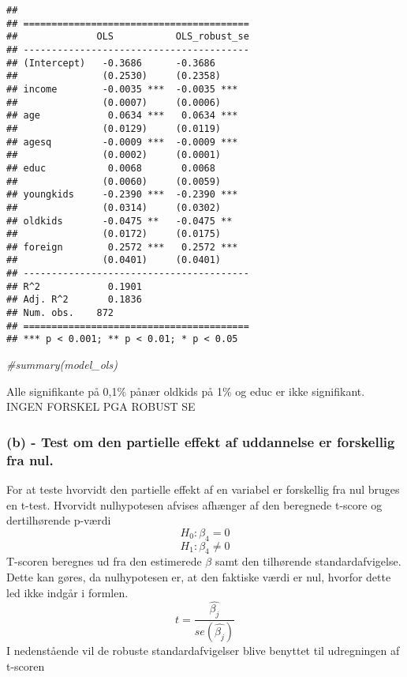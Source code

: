 \documentclass[
]{article}
\newenvironment{Shaded}{\begin{snugshade}}{\end{snugshade}}
\newcommand{\CommentTok}[1]{\textcolor[rgb]{0.56,0.35,0.01}{\textit{#1}}}
\begin{document}
\begin{verbatim}
## 
## ========================================
##              OLS           OLS_robust_se
## ----------------------------------------
## (Intercept)   -0.3686      -0.3686      
##               (0.2530)     (0.2358)     
## income        -0.0035 ***  -0.0035 ***  
##               (0.0007)     (0.0006)     
## age            0.0634 ***   0.0634 ***  
##               (0.0129)     (0.0119)     
## agesq         -0.0009 ***  -0.0009 ***  
##               (0.0002)     (0.0001)     
## educ           0.0068       0.0068      
##               (0.0060)     (0.0059)     
## youngkids     -0.2390 ***  -0.2390 ***  
##               (0.0314)     (0.0302)     
## oldkids       -0.0475 **   -0.0475 **   
##               (0.0172)     (0.0175)     
## foreign        0.2572 ***   0.2572 ***  
##               (0.0401)     (0.0401)     
## ----------------------------------------
## R^2            0.1901                   
## Adj. R^2       0.1836                   
## Num. obs.    872                        
## ========================================
## *** p < 0.001; ** p < 0.01; * p < 0.05
\end{verbatim}

\begin{Shaded}
\begin{Highlighting}[]
\CommentTok{\#summary(model\_ols)}
\end{Highlighting}
\end{Shaded}

Alle signifikante på 0,1\% pånær oldkids på 1\% og educ er ikke
signifikant. INGEN FORSKEL PGA ROBUST SE

\hypertarget{b---test-om-den-partielle-effekt-af-uddannelse-er-forskellig-fra-nul.}{%
\subsubsection{(b) - Test om den partielle effekt af uddannelse er
forskellig fra
nul.}\label{b---test-om-den-partielle-effekt-af-uddannelse-er-forskellig-fra-nul.}}

For at teste hvorvidt den partielle effekt af en variabel er forskellig
fra nul bruges en t-test. Hvorvidt nulhypotesen afvises afhænger af den
beregnede t-score og dertilhørende p-værdi \[H_0: \beta_4 = 0\]
\[H_1: \beta_4 \neq 0\] T-scoren beregnes ud fra den estimerede
\(\beta\) samt den tilhørende standardafvigelse. Dette kan gøres, da
nulhypotesen er, at den faktiske værdi er nul, hvorfor dette led ikke
indgår i formlen. \[t = \frac{\hat{\beta_j}}{se(\hat{\beta_j})}\] I
nedenstående vil de robuste standardafvigelser blive benyttet til
udregningen af t-scoren
\end{document}
